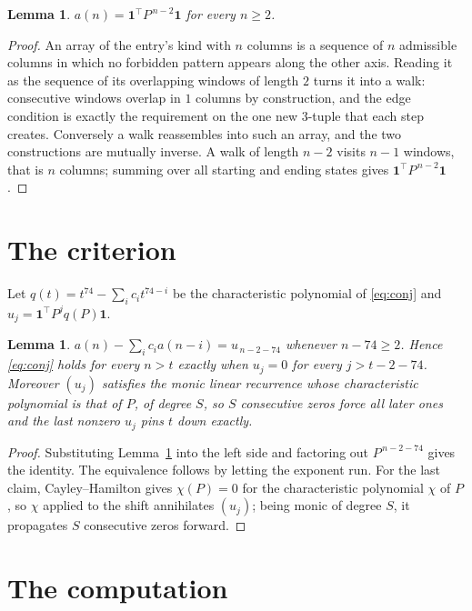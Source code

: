 \documentclass[11pt,a4paper]{article}
\theoremstyle{plain}
\newtheorem{lemma}[theorem]{Lemma}
\theoremstyle{definition}
\begin{document}
\begin{lemma}\label{lem:walk}
$a(n)=\mathbf{1}^{\!\top}P^{\,n-2}\mathbf{1}$ for every $n\ge2$.
\end{lemma}

\begin{proof}
An array of the entry's kind with $n$ columns is a sequence of $n$ admissible columns in
which no forbidden pattern appears along the other axis. Reading it as the sequence of its
overlapping windows of length $2$ turns it into a walk: consecutive windows overlap in
$1$ columns by construction, and the edge condition is exactly the requirement on the one
new $3$-tuple that each step creates. Conversely a walk reassembles into such an array,
and the two constructions are mutually inverse. A walk of length $n-2$ visits $n-1$
windows, that is $n$ columns; summing over all starting and ending states gives
$\mathbf{1}^{\!\top}P^{\,n-2}\mathbf{1}$.
\end{proof}

\section{The criterion}

Let $q(t)=t^{74}-\sum_i c_i t^{74-i}$ be the characteristic polynomial of
\eqref{eq:conj} and $u_j=\mathbf{1}^{\!\top}P^{j}q(P)\mathbf{1}$.

\begin{lemma}\label{lem:crit}
$a(n)-\sum_i c_i a(n-i)=u_{\,n-2-74}$ whenever $n-74\ge2$. Hence
\eqref{eq:conj} holds for every $n>t$ exactly when $u_j=0$ for every
$j>t-2-74$. Moreover $(u_j)$ satisfies the monic linear recurrence whose
characteristic polynomial is that of $P$, of degree $S$, so $S$ consecutive zeros force all
later ones and the last nonzero $u_j$ pins $t$ down exactly.
\end{lemma}

\begin{proof}
Substituting Lemma~\ref{lem:walk} into the left side and factoring out
$P^{\,n-2-74}$ gives the identity. The equivalence follows by letting the exponent
run. For the last claim, Cayley--Hamilton gives $\chi(P)=0$ for the characteristic
polynomial $\chi$ of $P$, so $\chi$ applied to the shift annihilates $(u_j)$; being monic of
degree $S$, it propagates $S$ consecutive zeros forward.
\end{proof}

\section{The computation}
\end{document}
